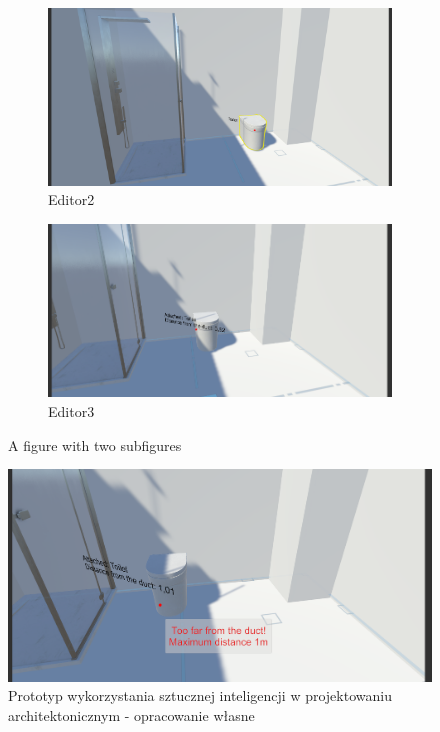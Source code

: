 \documentclass[runningheads]{llncs}
\begin{document}
\begin{figure}[H]
\centering
\begin{subfigure}{.5\textwidth}
  \centering
  \includegraphics[width=.93\linewidth]{aplikacja1.png}
    \caption{Editor2}
  \label{fig4}
\end{subfigure}%
\begin{subfigure}{.5\textwidth}
  \centering
  \includegraphics[width=.96\linewidth]{aplikacja2.png}
  \caption{Editor3}
  \label{fig5}
\end{subfigure}
\caption{A figure with two subfigures}
\end{figure}

\begin{figure}
\centering
\includegraphics[width=\textwidth]{aplikacja3.png}
\caption{Prototyp wykorzystania sztucznej inteligencji w projektowaniu architektonicznym - 
opracowanie własne} \label{fig3}
\end{figure}
\end{document}
